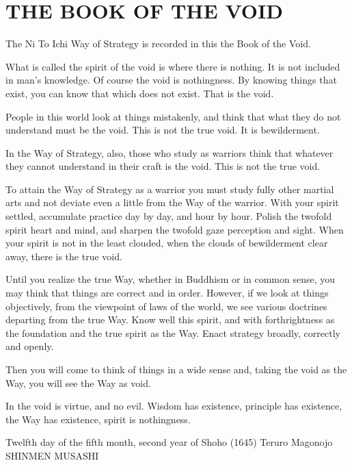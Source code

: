 \chapter{THE BOOK OF THE VOID}

The Ni To Ichi Way of Strategy is recorded in this the Book of the Void.

What is called the spirit of the void is where there is nothing. It is not included in man's knowledge. Of course the void is nothingness. By knowing things that exist, you can know that which does not exist. That is the void.

People in this world look at things mistakenly, and think that what they do not understand must be the void. This is not the true void. It is bewilderment.

In the Way of Strategy, also, those who study as warriors think that whatever they cannot understand in their craft is the void. This is not the true void.

To attain the Way of Strategy as a warrior you must study fully other martial arts and not deviate even a little from the Way of the warrior. With your spirit settled, accumulate practice day by day, and hour by hour. Polish the twofold spirit heart and mind, and sharpen the twofold gaze perception and sight. When your spirit is not in the least clouded, when the clouds of bewilderment clear away, there is the true void.

Until you realize the true Way, whether in Buddhism or in common sense, you may think that things are correct and in order. However, if we look at things objectively, from the viewpoint of laws of the world, we see various doctrines departing from the true Way. Know well this spirit, and with forthrightness as the foundation and the true spirit as the Way. Enact strategy broadly, correctly and openly.

Then you will come to think of things in a wide sense and, taking the void as the Way, you will see the Way as void.

In the void is virtue, and no evil. Wisdom has existence, principle has existence, the Way has existence, spirit is nothingness.

Twelfth day of the fifth month, second year of Shoho (1645)
Teruro Magonojo
SHINMEN MUSASHI 
